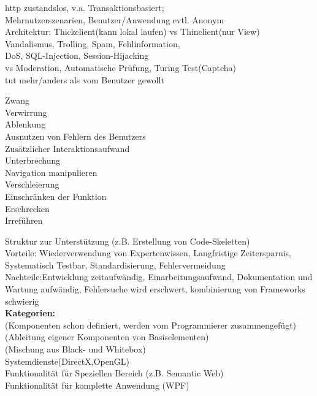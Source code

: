 http zustandslos, v.a. Transaktionsbasiert; \\
Mehrnutzerszenarien, Benutzer/Anwendung evtl. Anonym\\
Architektur: Thickclient(kann lokal laufen) vs Thinclient(nur View)\\

Vandalismus, Trolling, Spam, Fehlinformation,\\ 
DoS, SQL-Injection, Session-Hijacking  \\ 
vs  Moderation, Automatische Prüfung, Turing Test(Captcha)\\

tut mehr/anders als vom Benutzer gewollt
\begin{multicols}{2}
Zwang\\ Verwirrung\\ Ablenkung \\ Ausnutzen von Fehlern des Benutzers\\ Zusätzlicher Interaktionsaufwand\\ Unterbrechung\\ Navigation manipulieren\\ Verschleierung\\ Einschränken der Funktion\\ Erschrecken\\ Irreführen
\end{multicols}


Struktur zur Unterstützung (z.B. Erstellung von Code-Skeletten)\\
Vorteile: Wiederverwendung von Expertenwissen, Langfristige Zeitersparnis, Systematisch Testbar, Standardisierung, Fehlervermeidung\\
Nachteile:Entwicklung zeitaufwändig, Einarbeitungsaufwand, Dokumentation und Wartung aufwändig, Fehlersuche wird erschwert, kombinierung von Frameworks schwierig\\

\textbf{Kategorien:} \\
 (Komponenten schon definiert, werden vom Programmierer zusammengefügt) \\
 (Ableitung eigener Komponenten von Basiselementen) \\
 (Mischung aus Black- und Whitebox)\\

 Systemdienste(DirectX,OpenGL)\\
 Funktionalität für Speziellen Bereich (z.B. Semantic Web)\\
 Funktionalität für komplette Anwendung (WPF)\\
\\ \\




